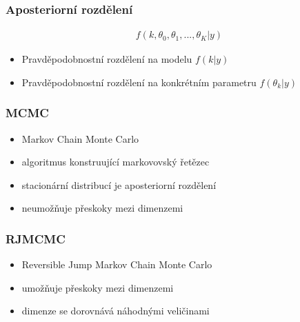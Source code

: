 \documentclass{beamer}
\begin{document}
\begin{frame}
\frametitle{Aposteriorní rozdělení}
	\begin{align*}
		f(k, \theta_0, \theta_1, ..., \theta_K | y) 
	\end{align*}
	\begin{itemize}
		\item Pravděpodobnostní rozdělení na modelu $f(k | y)$
		\item Pravděpodobnostní rozdělení na konkrétním parametru  $f(\theta_k | y)$
	\end{itemize}
\end{frame}

\begin{frame}
\frametitle{MCMC}
	\begin{itemize}
		\item Markov Chain Monte Carlo
		\item algoritmus konstruující markovovský řetězec
		\item stacionární distribucí je aposteriorní rozdělení
		\item neumožňuje přeskoky mezi dimenzemi
	\end{itemize}
\end{frame}
\begin{frame}
\frametitle{RJMCMC}
	\begin{itemize}
		\item Reversible Jump Markov Chain Monte Carlo
		\item umožňuje přeskoky mezi dimenzemi
		\item dimenze se dorovnává náhodnými veličinami
	\end{itemize}
\end{frame}
\end{document}
